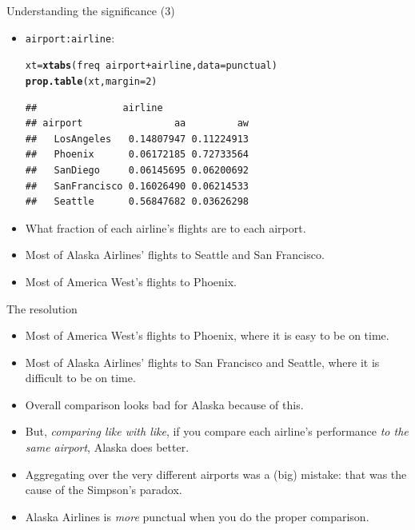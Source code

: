 \documentclass[unknownkeysallowed]{beamer}\usepackage[]{graphicx}\usepackage[]{color}
\makeatletter
\newcommand{\hlnum}[1]{\textcolor[rgb]{0.686,0.059,0.569}{#1}}%
\newcommand{\hlopt}[1]{\textcolor[rgb]{0,0,0}{#1}}%
\newcommand{\hlstd}[1]{\textcolor[rgb]{0.345,0.345,0.345}{#1}}%
\newcommand{\hlkwb}[1]{\textcolor[rgb]{0.69,0.353,0.396}{#1}}%
\newcommand{\hlkwc}[1]{\textcolor[rgb]{0.333,0.667,0.333}{#1}}%
\newcommand{\hlkwd}[1]{\textcolor[rgb]{0.737,0.353,0.396}{\textbf{#1}}}%
\newenvironment{kframe}{%
 \def\at@end@of@kframe{}%
 \ifinner\ifhmode%
  \def\at@end@of@kframe{\end{minipage}}%
  \begin{minipage}{\columnwidth}%
 \fi\fi%
 \def\FrameCommand##1{\hskip\@totalleftmargin \hskip-\fboxsep
 \colorbox{shadecolor}{##1}\hskip-\fboxsep
     \hskip-\linewidth \hskip-\@totalleftmargin \hskip\columnwidth}%
 \MakeFramed {\advance\hsize-\width
   \@totalleftmargin\z@ \linewidth\hsize
   \@setminipage}}%
 {\par\unskip\endMakeFramed%
 \at@end@of@kframe}
\newenvironment{knitrout}{}{} %
\makeatother
\begin{document}
\begin{frame}[fragile]{Understanding the significance (3)}
  
  \begin{itemize}
  \item \texttt{airport:airline}:
    
\begin{knitrout}
\color{fgcolor}\begin{kframe}
\begin{alltt}
\hlstd{xt}\hlkwb{=}\hlkwd{xtabs}\hlstd{(freq}\hlopt{~}\hlstd{airport}\hlopt{+}\hlstd{airline,}\hlkwc{data}\hlstd{=punctual)}
\hlkwd{prop.table}\hlstd{(xt,}\hlkwc{margin}\hlstd{=}\hlnum{2}\hlstd{)}
\end{alltt}
\begin{verbatim}
##               airline
## airport                aa         aw
##   LosAngeles   0.14807947 0.11224913
##   Phoenix      0.06172185 0.72733564
##   SanDiego     0.06145695 0.06200692
##   SanFrancisco 0.16026490 0.06214533
##   Seattle      0.56847682 0.03626298
\end{verbatim}
\end{kframe}
\end{knitrout}
\item What fraction of each airline's flights are to each airport.
\item Most of Alaska Airlines' flights to Seattle and San Francisco.
\item Most of America West's flights to Phoenix.
  \end{itemize}
  
\end{frame}

\begin{frame}[fragile]{The resolution}
  
  \begin{itemize}
  \item Most of America West's flights to Phoenix, where it is easy to
    be on time.
  \item Most of Alaska Airlines' flights to San Francisco and Seattle,
    where it is difficult to be on time.
  \item Overall comparison looks bad for Alaska because of this.
  \item But, \emph{comparing like with like}, if you compare each
    airline's performance \emph{to the same airport}, Alaska does better.
  \item Aggregating over the very different airports was a (big)
    mistake: that was the cause of the Simpson's paradox.
  \item Alaska Airlines is \emph{more} punctual when you do the proper comparison.
  \end{itemize}
  
\end{frame}
\end{document}
